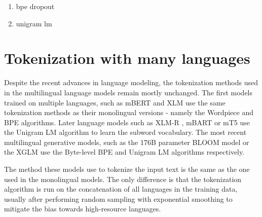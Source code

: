 \begin{enumerate}
    \item bpe dropout
    \item unigram lm
\end{enumerate}



\section{Tokenization with many languages}

Despite the recent advances in language modeling, the tokenization methods used in the multilingual language models remain mostly unchanged. The first models trained on multiple languages, such as mBERT \cite{devlin_bert_2019} and XLM \cite{lample_cross-lingual_2019} use the same tokenization methods as their monolingual versions - namely the Wordpiece and BPE algorithms.
Later language models such as XLM-R \cite{conneau_unsupervised_2020}, mBART \cite{liu_multilingual_2020} or mT5 \cite{xue_mt5_2021} use the Unigram LM algorithm to learn the subword vocabulary. The most recent multilingual generative models, such as the 176B parameter BLOOM model \cite{scao_bloom_2022} or the XGLM \cite{lin_few-shot_2022} use the Byte-level BPE and Unigram LM algorithms respectively.




The method these models use to tokenize the input text is the same as the one used in the monolingual models. The only difference is that the tokenization algorithm is run on the concatenation of all languages in the training data, usually after performing random sampling with exponential smoothing to mitigate the bias towards high-resource languages.

